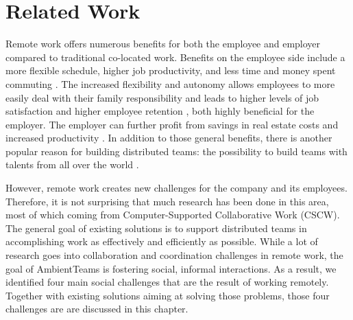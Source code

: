 \chapter{Related Work}
Remote work offers numerous benefits for both the employee and employer compared to traditional co-located work. Benefits on the employee side include a more flexible schedule, higher job productivity, and less time and money spent commuting \autocite{flores2019understanding, mulki2009set}. The increased flexibility and autonomy allows employees to more easily deal with their family responsibility and leads to higher levels of job satisfaction and higher employee retention \autocite{mulki2009set, gajendran2007good, madsen2011benefits}, both highly beneficial for the employer. The employer can further profit from savings in real estate costs and increased productivity \autocite{mulki2009set}. In addition to those general benefits, there is another popular reason for building distributed teams: the possibility to build teams with talents from all over the world \autocite{carmel1999global}.

However, remote work creates new challenges for the company and its employees. Therefore, it is not surprising that much research has been done in this area, most of which coming from Computer-Supported Collaborative Work (CSCW). The general goal of existing solutions is to support distributed teams in accomplishing work as effectively and efficiently as possible. While a lot of research goes into collaboration and coordination challenges in remote work, the goal of AmbientTeams is fostering social, informal interactions. As a result, we identified four main social challenges that are the result of working remotely. Together with existing solutions aiming at solving those problems, those four challenges are are discussed in this chapter.



